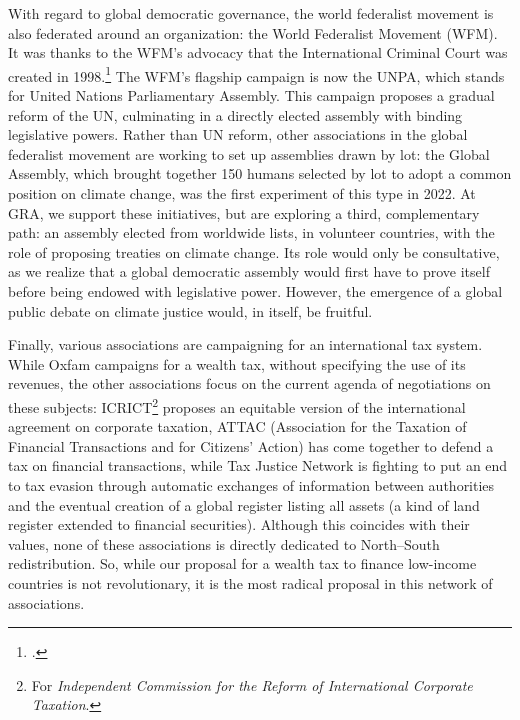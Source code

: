 \documentclass[a5paper,english,openany]{memoir}
\begin{document}
With regard to global democratic governance, the world federalist movement is also federated around an organization: %
the World Federalist Movement (WFM). It was thanks to the WFM's advocacy that the International Criminal Court was created in 1998.\footnote{\citet{schiff_building_2008}.} 
The WFM's flagship campaign is now the UNPA, which stands for United Nations Parliamentary Assembly. This campaign proposes a gradual reform of the UN, culminating in a directly elected assembly with binding legislative powers. Rather than UN reform, other associations in the global federalist movement are working to set up assemblies drawn by lot: the Global Assembly, which brought together 150 humans selected %
by lot to adopt a common position on climate change, was the first experiment of this type in 2022. 
At GRA, we support these initiatives, but are exploring a third, complementary path: 
an assembly elected from worldwide lists, in volunteer countries, with the role of proposing treaties on climate change. 
Its role would only be consultative, as we realize %
that a global democratic assembly would first have to prove itself before being endowed with legislative power. However, the emergence of a global public debate on climate justice would, in itself, be fruitful. %

Finally, various associations are campaigning for an international tax system. While Oxfam campaigns for a wealth tax, without specifying the use of its revenues, %
the other associations focus on the current agenda of negotiations on these subjects: ICRICT\footnote{For \textit{Independent Commission for the Reform of International Corporate Taxation}.} 
proposes an equitable version of the international agreement on corporate taxation, ATTAC (Association for the Taxation of Financial Transactions and for Citizens' Action) %
has come together to defend a tax on financial transactions, while Tax Justice Network is fighting to put an end to tax evasion through automatic exchanges of information between authorities and the eventual creation of a global register listing all assets (a kind of land register extended to financial securities). Although this coincides with their values, none of these associations is directly dedicated to North--South redistribution. So, while our proposal for a wealth tax to finance low-income countries is not revolutionary, it is the most radical proposal in this network of associations. 
\end{document}
